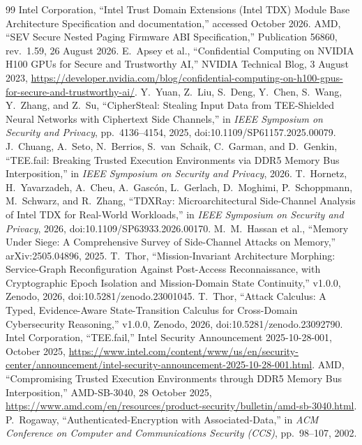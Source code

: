 \documentclass[11pt,letterpaper]{article}
\theoremstyle{plain}
\theoremstyle{definition}
\begin{document}
\begin{thebibliography}{99}
 Intel Corporation, ``Intel Trust Domain Extensions (Intel TDX) Module Base Architecture Specification and documentation,'' accessed October 2026.
 AMD, ``SEV Secure Nested Paging Firmware ABI Specification,'' Publication 56860, rev.~1.59, 26 August 2026.
 E.~Apsey et al., ``Confidential Computing on NVIDIA H100 GPUs for Secure and Trustworthy AI,'' NVIDIA Technical Blog, 3 August 2023, \url{https://developer.nvidia.com/blog/confidential-computing-on-h100-gpus-for-secure-and-trustworthy-ai/}.
 Y.~Yuan, Z.~Liu, S.~Deng, Y.~Chen, S.~Wang, Y.~Zhang, and Z.~Su, ``CipherSteal: Stealing Input Data from TEE-Shielded Neural Networks with Ciphertext Side Channels,'' in \emph{IEEE Symposium on Security and Privacy}, pp.~4136--4154, 2025, doi:10.1109/SP61157.2025.00079.
 J.~Chuang, A.~Seto, N.~Berrios, S.~van~Schaik, C.~Garman, and D.~Genkin, ``TEE.fail: Breaking Trusted Execution Environments via DDR5 Memory Bus Interposition,'' in \emph{IEEE Symposium on Security and Privacy}, 2026.
 T.~Hornetz, H.~Yavarzadeh, A.~Cheu, A.~Gasc\'on, L.~Gerlach, D.~Moghimi, P.~Schoppmann, M.~Schwarz, and R.~Zhang, ``TDXRay: Microarchitectural Side-Channel Analysis of Intel TDX for Real-World Workloads,'' in \emph{IEEE Symposium on Security and Privacy}, 2026, doi:10.1109/SP63933.2026.00170.
 M.~M.~Hassan et al., ``Memory Under Siege: A Comprehensive Survey of Side-Channel Attacks on Memory,'' arXiv:2505.04896, 2025.
 T.~Thor, ``Mission-Invariant Architecture Morphing: Service-Graph Reconfiguration Against Post-Access Reconnaissance, with Cryptographic Epoch Isolation and Mission-Domain State Continuity,'' v1.0.0, Zenodo, 2026, doi:10.5281/zenodo.23001045.
 T.~Thor, ``Attack Calculus: A Typed, Evidence-Aware State-Transition Calculus for Cross-Domain Cybersecurity Reasoning,'' v1.0.0, Zenodo, 2026, doi:10.5281/zenodo.23092790.
 Intel Corporation, ``TEE.fail,'' Intel Security Announcement 2025-10-28-001, October 2025, \url{https://www.intel.com/content/www/us/en/security-center/announcement/intel-security-announcement-2025-10-28-001.html}.
 AMD, ``Compromising Trusted Execution Environments through DDR5 Memory Bus Interposition,'' AMD-SB-3040, 28 October 2025, \url{https://www.amd.com/en/resources/product-security/bulletin/amd-sb-3040.html}.
 P.~Rogaway, ``Authenticated-Encryption with Associated-Data,'' in \emph{ACM Conference on Computer and Communications Security (CCS)}, pp.~98--107, 2002.

\end{thebibliography}
\end{document}
